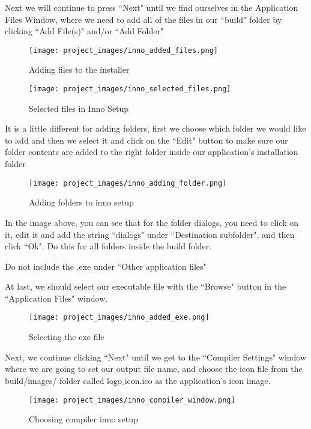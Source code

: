 	Next we will continue to press ``Next" until we find ourselves in the Application Files Window, where we need to add all of the files in our ``build" folder by clicking ``Add File(s)" and/or ``Add Folder"

\begin{figure}[H]
\centering
\texttt{[image: project\_images/inno\_added\_files.png]}
 \caption{Adding files to the installer}
 \label{fig:inno added files}
\end{figure}

\begin{figure}[H]
\centering
\texttt{[image: project\_images/inno\_selected\_files.png]}
 \caption{Selected files in Inno Setup}
 \label{fig:inno selected files}
\end{figure}
	
	It is a little different for adding folders, first we choose which folder we would like to add and then we select it and click on the ``Edit" button to make sure our folder contents are added to the right folder inside our application's installation folder

\begin{figure}[H]
\centering
\texttt{[image: project\_images/inno\_adding\_folder.png]}
 \caption{Adding folders to inno setup}
 \label{fig:inno adding folder}
\end{figure}

	In the image above, you can see that for the folder dialogs, you need to click on it, edit it and add the string ``dialogs" under ``Destination subfolder", and then click ``Ok". Do this for all folders inside the build folder.

	Do not include the .exe under ``Other application files"

	At last, we should select our executable file with the ``Browse" button in the ``Application Files" window.

\begin{figure}[H]
\centering
\texttt{[image: project\_images/inno\_added\_exe.png]}
 \caption{Selecting the exe file}
 \label{fig:inno added exe}
\end{figure}

	Next, we continue clicking ``Next" until we get to the ``Compiler Settings" window where we are going to set our output file name, and choose the icon file from the build/images/ folder called logo$\_$icon.ico as the application's icon image.

\begin{figure}[H]
\centering
\texttt{[image: project\_images/inno\_compiler\_window.png]}
 \caption{Choosing compiler inno setup}
 \label{fig:inno compiler window}
\end{figure}

